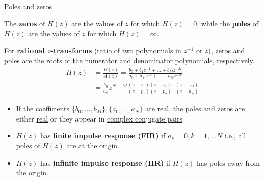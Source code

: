 \documentclass[10pt]{beamer}
\begin{document}
\begin{frame}{Poles and zeros}

The \textbf{zeros} of $H(z)$ are the values of $z$ for which $H(z) = 0$, while the \textbf{poles} of $H(z)$ are the values of $z$ for which $H(z) = \infty$. 

For \textbf{rational $z$-transforms} (ratio of two polynomials in $z^{-1}$ or $z$), zeros and poles are the roots of the numerator and denominator polynomials, respectively.
\begin{align*}
H(z) &= \frac{B(z)}{A(z)} = \frac{b_0 + b_1z^{-1}+\ldots+b_Mz^{-M}}{a_0 + a_1z^{-1}+\ldots+a_Nz^{-N}} \\
&= \frac{b_0}{a_0}z^{N-M}\frac{(z-z_1)(z-z_2)\ldots(z-z_M)}{(z-p_1)(z-p_2)\ldots(z-p_N)}
\end{align*}
\begin{itemize}
	\pause\item If the coefficients $\{b_0, \ldots, b_M\}, \{a_0, \ldots, a_N\}$ are \underline{real}, the poles and zeros are either \underline{real} or they appear in \underline{complex conjugate pairs}
	\pause\item $H(z)$ has \textbf{finite impulse response (FIR)} if $a_k = 0, k = 1, \ldots N$ i.e., all poles of $H(z)$ are at the origin.
	\pause\item $H(z)$ has \textbf{infinite impulse response (IIR)} if $H(z)$ has poles away from the origin.
\end{itemize}	
\end{frame}
\end{document}
